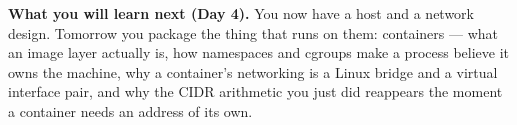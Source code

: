 \begin{keyidea}
\textbf{What you will learn next (Day 4).} You now have a host and a network design. Tomorrow you package the thing that runs on them: containers --- what an image layer actually is, how namespaces and cgroups make a process believe it owns the machine, why a container's networking is a Linux bridge and a virtual interface pair, and why the CIDR arithmetic you just did reappears the moment a container needs an address of its own.
\end{keyidea}
